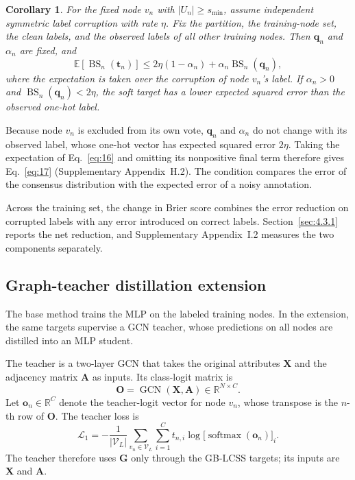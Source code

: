 \documentclass[times,review,10pt]{elsarticle}
\theoremstyle{definition}
\theoremstyle{plain}
\newtheorem{corollary}{Corollary}
\begin{document}
\begin{corollary}\label{cor:expected}
For the fixed node \(v_n\) with \(|U_n|\geq s_{\min}\), assume independent symmetric label corruption with rate \(\eta\). Fix the partition, the training-node set, the clean labels, and the observed labels of all other training nodes. Then \(\mathbf q_n\) and \(\alpha_n\) are fixed, and
\begin{equation}\label{eq:17}
\mathbb E[\operatorname{BS}_n(\mathbf t_n)]\leq2\eta(1-\alpha_n)+\alpha_n\operatorname{BS}_n(\mathbf q_n),
\end{equation}
where the expectation is taken over the corruption of node \(v_n\)'s label. If \(\alpha_n>0\) and \(\operatorname{BS}_n(\mathbf q_n)<2\eta\), the soft target has a lower expected squared error than the observed one-hot label.
\end{corollary}

Because node \(v_n\) is excluded from its own vote, \(\mathbf q_n\) and \(\alpha_n\) do not change with its observed label, whose one-hot vector has expected squared error \(2\eta\). Taking the expectation of Eq.~\eqref{eq:16} and omitting its nonpositive final term therefore gives Eq.~\eqref{eq:17} (Supplementary Appendix~H.2). The condition compares the error of the consensus distribution with the expected error of a noisy annotation.

Across the training set, the change in Brier score combines the error reduction on corrupted labels with any error introduced on correct labels. Section~\ref{sec:4.3.1} reports the net reduction, and Supplementary Appendix~I.2 measures the two components separately.

\subsection{Graph-teacher distillation extension}\label{sec:3.5}

The base method trains the MLP on the labeled training nodes. In the extension, the same targets supervise a GCN teacher, whose predictions on all nodes are distilled into an MLP student.

The teacher is a two-layer GCN that takes the original attributes \(\mathbf X\) and the adjacency matrix \(\mathbf A\) as inputs. Its class-logit matrix is
\begin{equation}\label{eq:18}
\mathbf O=\operatorname{GCN}(\mathbf X,\mathbf A)\in\mathbb R^{N\times C}.
\end{equation}
Let \(\mathbf o_n\in\mathbb R^C\) denote the teacher-logit vector for node \(v_n\), whose transpose is the \(n\)-th row of \(\mathbf O\). The teacher loss is
\begin{equation}\label{eq:19}
\mathcal L_1=-\frac{1}{|\mathcal V_L|}\sum_{v_n\in\mathcal V_L}\sum_{i=1}^C t_{n,i}\log\bigl[\operatorname{softmax}(\mathbf o_n)\bigr]_i.
\end{equation}
The teacher therefore uses \(\mathbf G\) only through the GB-LCSS targets; its inputs are \(\mathbf X\) and \(\mathbf A\).
\end{document}
